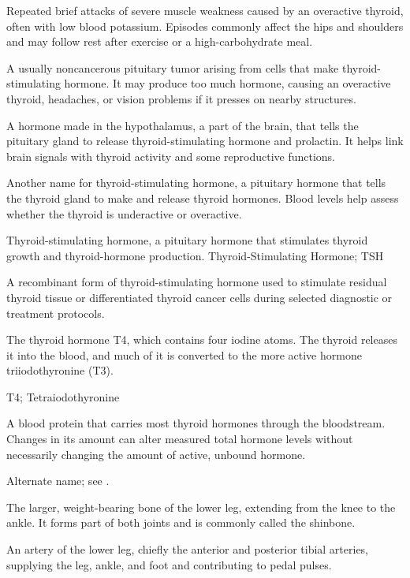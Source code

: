  Repeated brief attacks of severe muscle weakness caused by an overactive thyroid, often with low blood potassium. Episodes commonly affect the hips and shoulders and may follow rest after exercise or a high-carbohydrate meal.

 A usually noncancerous pituitary tumor arising from cells that make thyroid-stimulating hormone. It may produce too much hormone, causing an overactive thyroid, headaches, or vision problems if it presses on nearby structures.

 A hormone made in the hypothalamus, a part of the brain, that tells the pituitary gland to release thyroid-stimulating hormone and prolactin. It helps link brain signals with thyroid activity and some reproductive functions.

 Another name for thyroid-stimulating hormone, a pituitary hormone that tells the thyroid gland to make and release thyroid hormones. Blood levels help assess whether the thyroid is underactive or overactive.

 Thyroid-stimulating hormone, a pituitary hormone that stimulates thyroid growth and thyroid-hormone production.
\synonyms
Thyroid-Stimulating Hormone; TSH

 A recombinant form of thyroid-stimulating hormone used to stimulate residual thyroid tissue or differentiated thyroid cancer cells during selected diagnostic or treatment protocols.

 The thyroid hormone T4, which contains four iodine atoms. The thyroid releases it into the blood, and much of it is converted to the more active hormone triiodothyronine (T3).

\synonyms
T4; Tetraiodothyronine

 A blood protein that carries most thyroid hormones through the bloodstream. Changes in its amount can alter measured total hormone levels without necessarily changing the amount of active, unbound hormone.

 Alternate name; see .

 The larger, weight-bearing bone of the lower leg, extending from the knee to the ankle. It forms part of both joints and is commonly called the shinbone.

 An artery of the lower leg, chiefly the anterior and posterior tibial arteries, supplying the leg, ankle, and foot and contributing to pedal pulses.

